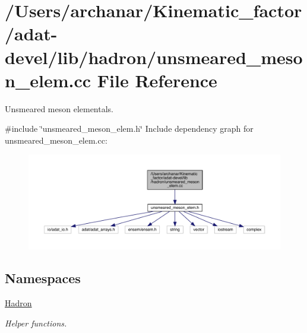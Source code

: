 \hypertarget{adat-devel_2lib_2hadron_2unsmeared__meson__elem_8cc}{}\section{/\+Users/archanar/\+Kinematic\+\_\+factor/adat-\/devel/lib/hadron/unsmeared\+\_\+meson\+\_\+elem.cc File Reference}
\label{adat-devel_2lib_2hadron_2unsmeared__meson__elem_8cc}


Unsmeared meson elementals.  


{\ttfamily \#include \char`\"{}unsmeared\+\_\+meson\+\_\+elem.\+h\char`\"{}}\newline
Include dependency graph for unsmeared\+\_\+meson\+\_\+elem.\+cc\+:
\nopagebreak
\begin{figure}[H]
\begin{center}
\leavevmode
\includegraphics[width=350pt]{d4/dbd/adat-devel_2lib_2hadron_2unsmeared__meson__elem_8cc__incl}
\end{center}
\end{figure}
\subsection*{Namespaces}
\begin{DoxyCompactItemize}
\item 
 \mbox{\hyperlink{namespaceHadron}{Hadron}}
\begin{DoxyCompactList}\small\item\em Helper functions. \end{DoxyCompactList}\end{DoxyCompactItemize}
